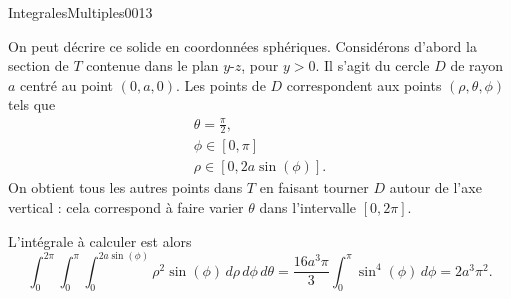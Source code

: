 \begin{corrige}{IntegralesMultiples0013}

On peut décrire ce solide en coordonnées sphériques. Considérons d'abord la section de $T$ contenue dans le plan $y$-$z$, pour $y>0$. Il s'agit du cercle $D$ de rayon $a$ centré au point $(0,a,0)$. Les points de $D$ correspondent aux points $(\rho, \theta, \phi)$ tels que 
\begin{equation}
  \begin{array}{l}
    \theta= \frac{\pi}{2},\\
    \phi\in\left[0,\pi\right]\\
    \rho\in\left[0,2a\sin(\phi)\right].
  \end{array}
\end{equation}
On obtient tous les autres points dans $T$ en faisant tourner $D$ autour de l'axe vertical : cela correspond à faire varier $\theta$ dans l'intervalle $[0,2\pi]$. 

L'intégrale à calculer est alors
\begin{equation}
  \int_{0}^{2\pi}\int_{0}^{\pi}\int_{0}^{2a\sin(\phi)} \rho^2\sin(\phi)\, d\rho\, d\phi \, d\theta = \frac{16a^3\pi}{3} \int_{0}^{\pi} \sin^4(\phi)\, d\phi=2a^3\pi^2. 
\end{equation}



\end{corrige}
